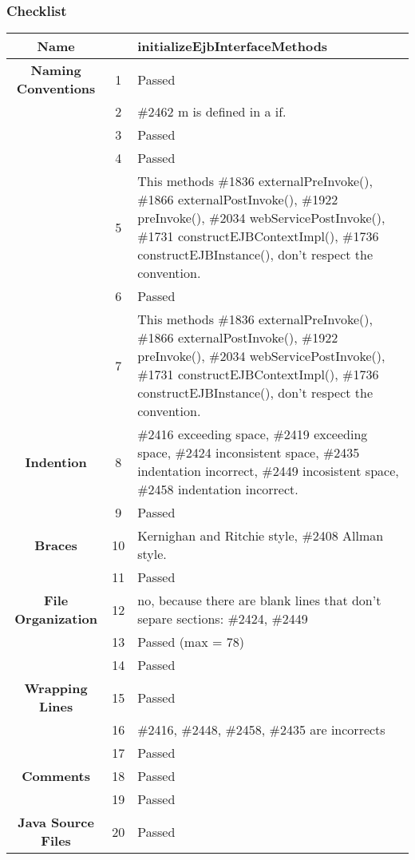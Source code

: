 \documentclass[11pt, a4paper,titlepage]{article}
\begin{document}
\subsubsection{Checklist}
  \begin{tabularx}{\textwidth}{| c |c |X |}
  	\hline \textbf{Name} & & initializeEjbInterfaceMethods \\
  	\hline \textbf{Naming Conventions} & 1  & Passed  \\
  	\hline  & 2 & \#2462 m is defined in a if.
  	\\
  	\hline  & 3 & Passed \\
  	\hline  & 4 & Passed \\
  	\hline  & 5 & This methods \#1836 externalPreInvoke(), \#1866 externalPostInvoke(), \#1922 preInvoke(), \#2034 webServicePostInvoke(), \#1731 \textunderscore constructEJBContextImpl(), \#1736 \textunderscore constructEJBInstance(), don't respect the convention. \\
  	\hline  & 6 & Passed \\
  	\hline  & 7 & This methods \#1836 externalPreInvoke(), \#1866 externalPostInvoke(), \#1922 preInvoke(), \#2034 webServicePostInvoke(), \#1731 \textunderscore constructEJBContextImpl(), \#1736 \textunderscore constructEJBInstance(), don't respect the convention. \\
  	\hline \textbf{Indention} & 8 & \#2416 exceeding space, \#2419 exceeding space, \#2424 inconsistent space,
  	\#2435 indentation incorrect, \#2449 incosistent space, \#2458 indentation incorrect. \\
  	\hline  & 9 & Passed \\
  	\hline \textbf{Braces} & 10 & Kernighan and Ritchie style, \#2408 Allman style. \\
  	\hline  & 11 & Passed \\
  	\hline \textbf{File Organization} & 12 & no, because there are blank lines that don't separe sections: \#2424, \#2449 \\
  	\hline  & 13 & Passed (max = 78) \\
  	\hline  & 14 & Passed \\
  	\hline \textbf{Wrapping Lines} & 15 & Passed \\
  	\hline  & 16 & \#2416, \#2448, \#2458, \#2435 are incorrects \\
  	\hline  & 17 & Passed \\
  	\hline \textbf{Comments} & 18 & Passed \\
  	\hline  & 19 & Passed \\
  	\hline \textbf{Java Source Files} & 20 & Passed \\ 
  	\hline
  \end{tabularx}
\end{document}
